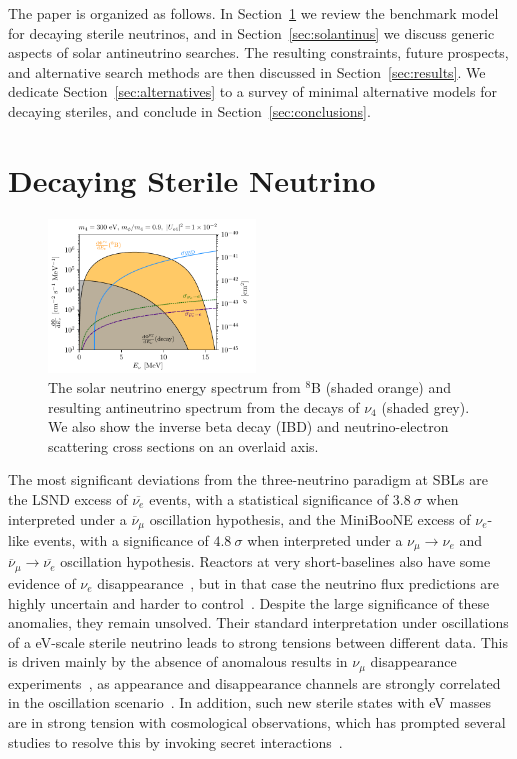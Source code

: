 \documentclass[
reprint,
superscriptaddress,
showpacs,
preprintnumbers,
nofootinbib,
nobibnotes,
amsmath,
amssymb, 
aps,
prd,
floatfix
]{revtex4-1}
\newcommand{\refsec}[1]{Section~\ref{#1}}
\begin{document}
The paper is organized as follows. In \refsec{sec:model} we review the benchmark model for decaying sterile neutrinos, and in \refsec{sec:solantinus} we discuss generic aspects of solar antineutrino searches. The resulting constraints, future prospects, and alternative search methods are then discussed in \refsec{sec:results}. We dedicate \refsec{sec:alternatives} to a survey of minimal alternative models for decaying steriles, and conclude in \refsec{sec:conclusions}.

\section{Decaying Sterile Neutrino}\label{sec:model}
%
\begin{figure}[t]
    \centering
    \includegraphics[width=0.49\textwidth]{Spectrum_scalar_300_MZ_270.pdf}
    \caption{The solar neutrino energy spectrum from $^8$B (shaded orange) and resulting antineutrino spectrum from the decays of $\nu_4$ (shaded grey). We also show the inverse beta decay (IBD) and neutrino-electron scattering cross sections on an overlaid axis. \label{fig:B8flux}}
\end{figure}
%

The most significant deviations from the three-neutrino paradigm at SBLs are the LSND excess of $\overline{\nu_e}$ events, with a statistical significance of $3.8~\sigma$ when interpreted under a $\overline{\nu}_\mu$ oscillation hypothesis, and the MiniBooNE excess of $\nu_e$-like events, with a significance of $4.8~\sigma$ when interpreted under a ${\nu}_\mu\to {\nu_e}$ and $\overline{\nu}_\mu\to \overline{\nu_e}$ oscillation hypothesis. Reactors at very short-baselines also have some evidence of $\nu_e$ disappearance~\cite{Mention:2011rk,Dentler:2017tkw}, but in that case the neutrino flux predictions are highly uncertain and harder to control~\cite{Berryman:2019hme,Berryman:2020agd}. Despite the large significance of these anomalies, they remain unsolved. Their standard interpretation under oscillations of a eV-scale sterile neutrino leads to strong tensions between different data. This is driven mainly by the absence of anomalous results in $\nu_\mu$ disappearance experiments~\cite{Dentler:2018sju,Diaz:2019fwt}, as appearance and disappearance channels are strongly correlated in the oscillation scenario~\cite{Okada:1996kw,Bilenky:1996rw}. In addition, such new sterile states with eV masses are in strong tension with cosmological observations, which has prompted several studies to resolve this by invoking secret interactions~\cite{Dasgupta:2013zpn,Hannestad:2013ana,Vecchi:2016lty,Farzan:2019yvo,Cline:2019seo}.  
\end{document}
